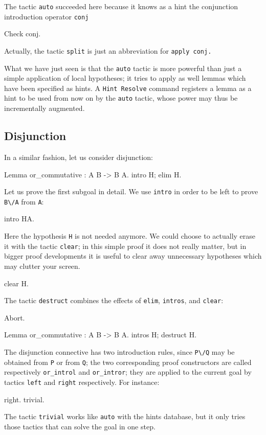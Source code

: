 \documentclass[11pt,a4paper]{book}
\begin{document}
The tactic \verb:auto: succeeded here because it knows as a hint the
conjunction introduction operator \verb+conj+
\begin{coq_example}
Check conj.
\end{coq_example}

Actually, the tactic \verb+split+ is just an abbreviation for \verb+apply conj.+

What we have just seen is that the \verb:auto: tactic is more powerful than
just a simple application of local hypotheses; it tries to apply as well
lemmas which have been specified as hints. A
\verb:Hint Resolve: command registers a
lemma as a hint to be used from now on by the \verb:auto: tactic, whose power
may thus be incrementally augmented.

\subsection{Disjunction}

In a similar fashion, let us consider disjunction:

\begin{coq_example}
Lemma or_commutative : A \/ B -> B \/ A.
intro H; elim H.
\end{coq_example}

Let us prove the first subgoal in detail. We use \verb:intro: in order to
be left to prove \verb:B\/A: from \verb:A::

\begin{coq_example}
intro HA.
\end{coq_example}

Here the hypothesis \verb:H: is not needed anymore. We could choose to
actually erase it with the tactic \verb:clear:; in this simple proof it
does not really matter, but in bigger proof developments it is useful to
clear away unnecessary hypotheses which may clutter your screen.
\begin{coq_example}
clear H.
\end{coq_example}

The tactic \verb:destruct: combines the effects of \verb:elim:, \verb:intros:,
and \verb:clear::

\begin{coq_eval}
Abort.
\end{coq_eval}
\begin{coq_example}
Lemma or_commutative : A \/ B -> B \/ A.
intros H; destruct H.
\end{coq_example}

The disjunction connective has two introduction rules, since \verb:P\/Q:
may be obtained from \verb:P: or from \verb:Q:; the two corresponding
proof constructors are called respectively \verb:or_introl: and
\verb:or_intror:; they are applied to the current goal by tactics
\verb:left: and \verb:right: respectively. For instance:
\begin{coq_example}
right.
trivial.
\end{coq_example}
The tactic \verb:trivial: works like \verb:auto: with the hints
database, but it only tries those tactics that can solve the goal in one
step.
\end{document}
